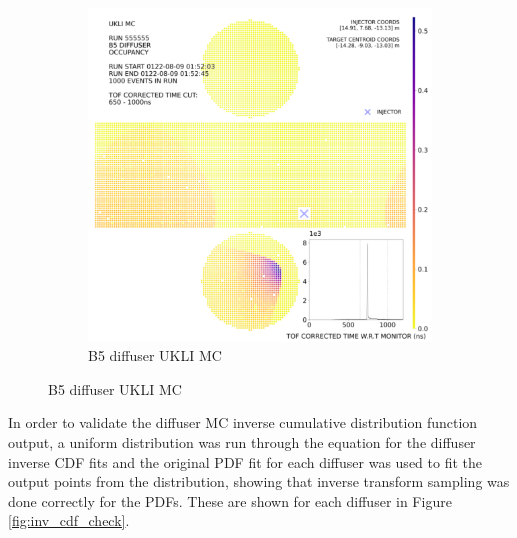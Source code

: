 \begin{figure}[htp]
        \medskip
        
        \begin{subfigure}{0.49\columnwidth}
        \centering
        \includegraphics[width=\textwidth]{Figures/ukli_diff_mc_B5.PNG}
        \caption{B5 diffuser UKLI MC}
        
        \end{subfigure}
    
        \end{figure}
    


In order to validate the diffuser MC inverse cumulative distribution function output, a uniform distribution was run through the equation for the diffuser inverse CDF fits and the original PDF fit for each diffuser was used to fit the output points from the distribution, showing that inverse transform sampling was done correctly for the PDFs. These are shown for each diffuser in Figure \ref{fig:inv_cdf_check}. 



